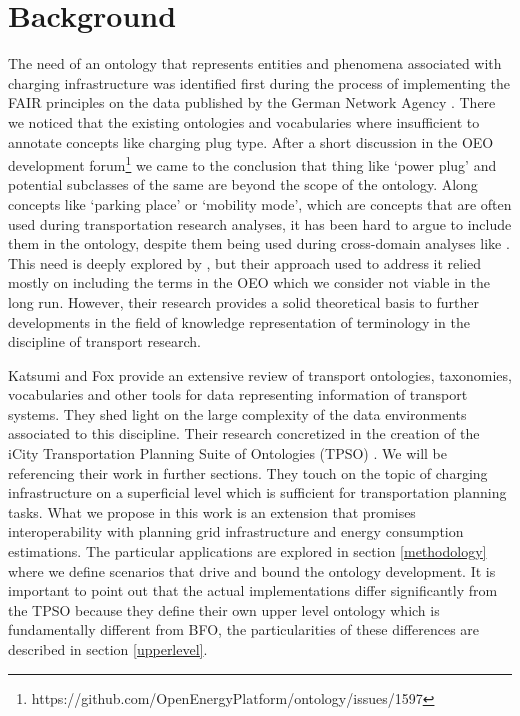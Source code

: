 ﻿\section{Background}
\label{statementofneed}
The need of an ontology that represents entities and phenomena associated with
charging infrastructure was identified first during the process of implementing
the FAIR principles on the data published by the German Network Agency
\cite{ArellanoRuiz.2024}. There we noticed that the existing ontologies and
vocabularies where insufficient to annotate concepts like charging plug type.
After a short discussion in the OEO development
forum\footnote{https://github.com/OpenEnergyPlatform/ontology/issues/1597} we
came to the conclusion that thing like `power plug' and potential subclasses of
the same are beyond the scope of the ontology. Along concepts like `parking
place' or `mobility mode', which are concepts that are often used during
transportation research analyses, it has been hard to argue to include them in the
ontology, despite them being used during cross-domain analyses like
\cite{Hecht.2022}. This need is deeply explored by \cite{Mittermeier.2023}, but
their approach used to address it relied mostly on including the terms in the
OEO which we consider not viable in the long run. However, their research
provides a solid theoretical basis to further developments in the field of
knowledge representation of terminology in the discipline of transport
research.

Katsumi and Fox \cite{Katsumi.2018} provide an extensive review of transport
ontologies, taxonomies, vocabularies and other tools for data representing
information of transport systems. They shed light on the large complexity of
the data environments associated to this discipline. Their research concretized
in the creation of the iCity Transportation Planning Suite of Ontologies (TPSO)
\cite{Katsumi.2019}. We will be referencing their work in further sections.
They touch on the topic of charging infrastructure on a superficial level which
is sufficient for transportation planning tasks. What we propose in this work
is an extension that promises interoperability with planning grid
infrastructure and energy consumption estimations. The particular applications
are explored in section \ref{methodology} where we define scenarios that drive
and bound the ontology development. It is important to point out that the actual
implementations differ significantly from the TPSO because they define their
own upper level ontology which is fundamentally different from BFO, the
particularities of these differences are described in section \ref{upperlevel}.